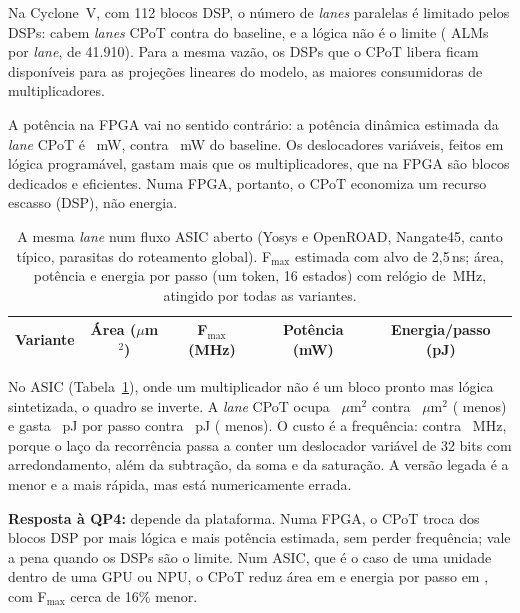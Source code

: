 \documentclass[12pt]{article}
\begin{document}
Na Cyclone~V, com 112 blocos DSP, o número de \emph{lanes} paralelas é limitado pelos DSPs: cabem \LanesCpot{} \emph{lanes} CPoT contra \LanesMult{} do baseline, e a lógica não é o limite (\AlmCpot{} ALMs por \emph{lane}, de 41.910). Para a mesma vazão, os DSPs que o CPoT libera ficam disponíveis para as projeções lineares do modelo, as maiores consumidoras de multiplicadores.

A potência na FPGA vai no sentido contrário: a potência dinâmica estimada da \emph{lane} CPoT é \QPowCpot~mW, contra \QPowMult~mW do baseline. Os deslocadores variáveis, feitos em lógica programável, gastam mais que os multiplicadores, que na FPGA são blocos dedicados e eficientes. Numa FPGA, portanto, o CPoT economiza um recurso escasso (DSP), não energia.

\begin{table}[htb]
\centering
\caption{A mesma \emph{lane} num fluxo ASIC aberto (Yosys e OpenROAD, Nangate45, canto típico, parasitas do roteamento global). F$_{\max}$ estimada com alvo de 2,5\,ns; área, potência e energia por passo (um token, 16 estados) com relógio de \AsicIsoMhz\,MHz, atingido por todas as variantes.}
\label{tab:asic}
\footnotesize
\begin{tabular}{lcccc}
\toprule
\textbf{Variante} & \textbf{Área ($\mu$m$^2$)} & \textbf{F$_{\max}$ (MHz)} & \textbf{Potência (mW)} & \textbf{Energia/passo (pJ)} \\
\midrule

\end{tabular}
\end{table}

No ASIC (Tabela~\ref{tab:asic}), onde um multiplicador não é um bloco pronto mas lógica sintetizada, o quadro se inverte. A \emph{lane} CPoT ocupa \AsicAreaCpot~$\mu$m$^2$ contra \AsicAreaMult~$\mu$m$^2$ (\AsicAreaSaving{} menos) e gasta \AsicEnergyCpot~pJ por passo contra \AsicEnergyMult~pJ (\AsicEnergySaving{} menos). O custo é a frequência: \AsicFmaxCpot{} contra \AsicFmaxMult~MHz, porque o laço da recorrência passa a conter um deslocador variável de 32 bits com arredondamento, além da subtração, da soma e da saturação. A versão legada é a menor e a mais rápida, mas está numericamente errada.

\textbf{Resposta à QP4:} depende da plataforma. Numa FPGA, o CPoT troca \DspSaving{} dos blocos DSP por mais lógica e mais potência estimada, sem perder frequência; vale a pena quando os DSPs são o limite. Num ASIC, que é o caso de uma unidade dentro de uma GPU ou NPU, o CPoT reduz área em \AsicAreaSaving{} e energia por passo em \AsicEnergySaving, com F$_{\max}$ cerca de 16\% menor.
\end{document}
